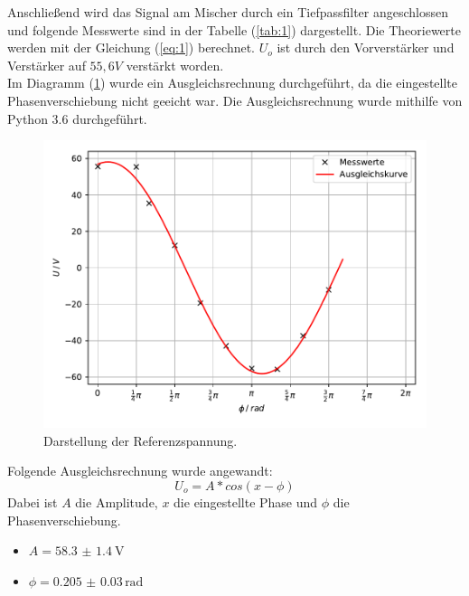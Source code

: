 Anschließend wird das Signal am Mischer durch ein Tiefpassfilter angeschlossen und folgende
Messwerte sind in der Tabelle (\ref{tab:1}) dargestellt.
Die Theoriewerte werden mit der Gleichung (\ref{eq:1}) berechnet.
$U_o$ ist durch den Vorverstärker und Verstärker auf $55,6 V$ verstärkt worden.\\
Im Diagramm (\ref{abb:5}) wurde ein Ausgleichsrechnung durchgeführt, da die eingestellte Phasenverschiebung
nicht geeicht war. Die Ausgleichsrechnung wurde mithilfe von Python 3.6 durchgeführt.
\begin{figure}[H]
	\centering
	\includegraphics[width=\textwidth]{kurve1.pdf}
	\caption{Darstellung der Referenzspannung.}
	\label{abb:5}
\end{figure}
Folgende Ausgleichsrechnung wurde angewandt:
\begin{equation}
	 U_o = A * cos(x - \phi)
	 \label{eq:10}
 \end{equation}
Dabei ist $A$ die Amplitude, $x$ die eingestellte Phase und $\phi$ die Phasenverschiebung.
\begin{itemize}
	\item $A = \SI{58.3(14)}{\volt}$
	\item $\phi = \num{0.205(30)} \, \text{rad}$
\end{itemize}

